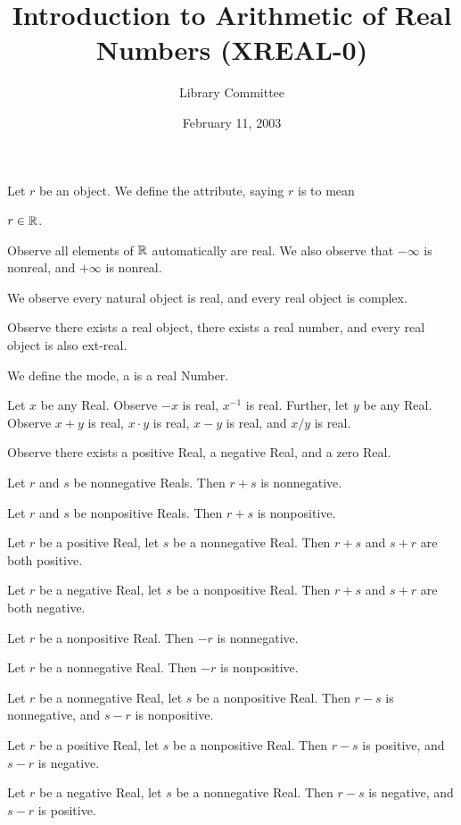\documentclass{article}
\title{Introduction to Arithmetic of Real Numbers (XREAL-0)}
\author{Library Committee}
\date{February 11, 2003}
\begin{document}
\maketitle
\begin{definition}
Let $r$ be an object.
We define the attribute, saying $r$ is  to mean
\begin{defn}
\item $r\in\mathbb{R}$.
\end{defn}
\end{definition}
Observe all elements of $\mathbb{R}$ automatically are real.
We also observe that $-\infty$ is nonreal, and $+\infty$ is nonreal.

We observe every natural object is real, and every real object is
complex.

Observe there exists a real object, there exists a real number, and
every real object is also ext-real.

\begin{definition}
We define the mode, a  is a real Number.
\end{definition}

Let $x$ be any Real. Observe $-x$ is real, $x^{-1}$ is real. Further,
let $y$ be any Real. Observe $x+y$ is real, $x\cdot y$ is real, $x-y$ is
real, and $x/y$ is real.

Observe there exists a positive Real, a negative Real, and a zero Real.

Let $r$ and $s$ be nonnegative Reals. Then $r+s$ is nonnegative.

Let $r$ and $s$ be nonpositive Reals. Then $r+s$ is nonpositive.

Let $r$ be a positive Real, let $s$ be a nonnegative Real. Then $r+s$
and $s+r$ are both positive.

Let $r$ be a negative Real, let $s$ be a nonpositive Real. Then $r+s$
and $s+r$ are both negative.

Let $r$ be a nonpositive Real. Then $-r$ is nonnegative.

Let $r$ be a nonnegative Real. Then $-r$ is nonpositive.

Let $r$ be a nonnegative Real, let $s$ be a nonpositive Real.
Then $r-s$ is nonnegative, and $s-r$ is nonpositive.

Let $r$ be a positive Real, let $s$ be a nonpositive Real.
Then $r-s$ is positive, and $s-r$ is negative.

Let $r$ be a negative Real, let $s$ be a nonnegative Real.
Then $r-s$ is negative, and $s-r$ is positive.
\end{document}
